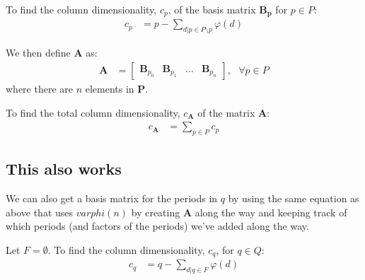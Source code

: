 To find the column dimensionality, $c_{p}$, of the basis matrix $\bm{B_p}$ for $p \in P$:
\begin{align*}
    c_{p} &= p - \sum_{d|p \in P \setminus p} \varphi(d)
\end{align*}


We then define $\bm{A}$ as:
\begin{align*}
    \bm{A} &= \begin{bmatrix}
            \bm{B}_{p_0} &
            \bm{B}_{p_1} &
            \hdots &
            \bm{B}_{p_n}
        \end{bmatrix}
        , \text{ } \forall p \in P
\end{align*}
where there are $n$ elements in $\bm{P}$.

To find the total column dimensionality, $c_{\boldsymbol{A}}$ of the matrix $\bm{A}$:
\begin{align*}
    c_{\bm{A}} &= \sum_{p \in P} c_p
\end{align*}


\subsection{This also works}
We can also get a basis matrix for the periods in $q$ by using the same equation as above that uses $varphi(n)$ by creating $\bm{A}$ along the way and keeping track of which periods (and factors of the periods) we've added along the way.

Let $F = \emptyset$. To find the column dimensionality, $c_q$, for $q \in Q$:
\begin{align}
    c_q &= q - \sum_{d|q \in F} \varphi(d)
\end{align}

